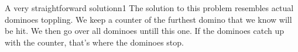 \documentclass{writeup}
\begin{document}
\begin{solutions}
  \begin{solution}{A very straightforward solution}{n}{1}
    The solution to this problem resembles actual dominoes toppling.
    We keep a counter of the furthest domino that we know will be hit.
    We then go over all dominoes untill this one.
    If the dominoes catch up with the counter, that's where the dominoes stop.
  \end{solution}
\end{solutions}
\end{document}
